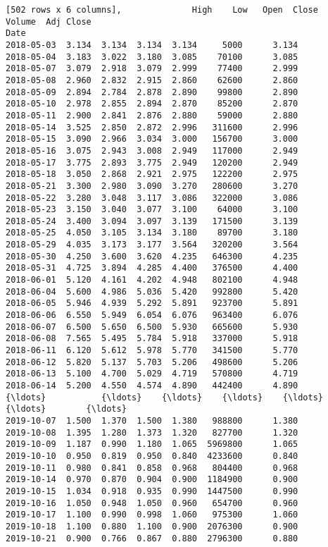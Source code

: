 \documentclass[11pt]{article}
\begin{document}
\begin{Verbatim}[commandchars=\\\{\}]
[502 rows x 6 columns],              High    Low   Open  Close   Volume  Adj Close
Date                                                      
2018-05-03  3.134  3.134  3.134  3.134     5000      3.134
2018-05-04  3.183  3.022  3.180  3.085    70100      3.085
2018-05-07  3.079  2.918  3.079  2.999    77400      2.999
2018-05-08  2.960  2.832  2.915  2.860    62600      2.860
2018-05-09  2.894  2.784  2.878  2.890    99800      2.890
2018-05-10  2.978  2.855  2.894  2.870    85200      2.870
2018-05-11  2.900  2.841  2.876  2.880    59000      2.880
2018-05-14  3.525  2.850  2.872  2.996   311600      2.996
2018-05-15  3.090  2.966  3.034  3.000   156700      3.000
2018-05-16  3.075  2.943  3.008  2.949   117000      2.949
2018-05-17  3.775  2.893  3.775  2.949   120200      2.949
2018-05-18  3.050  2.868  2.921  2.975   122200      2.975
2018-05-21  3.300  2.980  3.090  3.270   280600      3.270
2018-05-22  3.280  3.048  3.117  3.086   322000      3.086
2018-05-23  3.150  3.040  3.077  3.100    64000      3.100
2018-05-24  3.400  3.094  3.097  3.139   171500      3.139
2018-05-25  4.050  3.105  3.134  3.180    89700      3.180
2018-05-29  4.035  3.173  3.177  3.564   320200      3.564
2018-05-30  4.250  3.600  3.620  4.235   646300      4.235
2018-05-31  4.725  3.894  4.285  4.400   376500      4.400
2018-06-01  5.120  4.161  4.202  4.948   802100      4.948
2018-06-04  5.600  4.986  5.036  5.420   992800      5.420
2018-06-05  5.946  4.939  5.292  5.891   923700      5.891
2018-06-06  6.550  5.949  6.054  6.076   963400      6.076
2018-06-07  6.500  5.650  6.500  5.930   665600      5.930
2018-06-08  7.565  5.495  5.784  5.918   337000      5.918
2018-06-11  6.120  5.612  5.978  5.770   341500      5.770
2018-06-12  5.820  5.137  5.703  5.206   498600      5.206
2018-06-13  5.100  4.700  5.029  4.719   570800      4.719
2018-06-14  5.200  4.550  4.574  4.890   442400      4.890
{\ldots}           {\ldots}    {\ldots}    {\ldots}    {\ldots}      {\ldots}        {\ldots}
2019-10-07  1.500  1.370  1.500  1.380   988800      1.380
2019-10-08  1.395  1.280  1.373  1.320   827700      1.320
2019-10-09  1.187  0.990  1.180  1.065  5969800      1.065
2019-10-10  0.950  0.819  0.950  0.840  4233600      0.840
2019-10-11  0.980  0.841  0.858  0.968   804400      0.968
2019-10-14  0.970  0.870  0.904  0.900  1184900      0.900
2019-10-15  1.034  0.918  0.935  0.990  1447500      0.990
2019-10-16  1.050  0.948  1.050  0.960   654700      0.960
2019-10-17  1.100  0.990  0.998  1.060   975300      1.060
2019-10-18  1.100  0.880  1.100  0.900  2076300      0.900
2019-10-21  0.900  0.766  0.867  0.880  2796300      0.880

\end{Verbatim}
\end{document}
